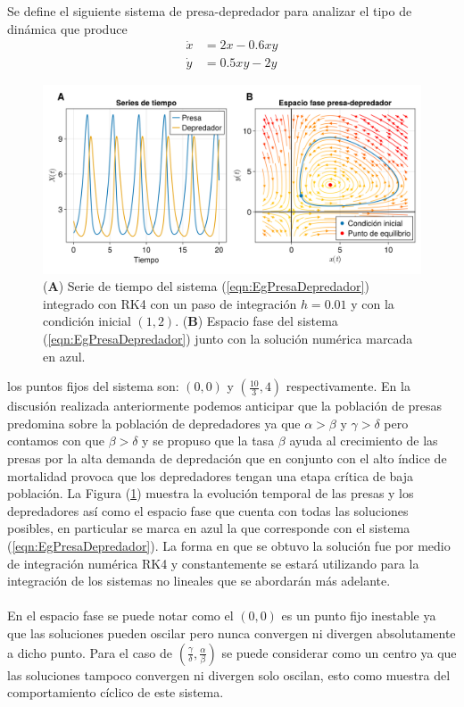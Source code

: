 \begin{ejemplo}\label{eg:PresaDepredador}
	Se define el siguiente sistema de presa-depredador para analizar el tipo de dinámica que produce
	\begin{equation}\label{eqn:EgPresaDepredador}
		\begin{split}
			\dot{x} &= 2x-0.6xy \\
			\dot{y} &= 0.5xy-2y
		\end{split}
	\end{equation}
	\begin{figure}[h!]
		\centering
		\includegraphics[scale=0.215]{../../Imagenes/Espacio fase PD}
		\caption{(\textbf{A}) Serie de tiempo del sistema (\ref{eqn:EgPresaDepredador}) integrado con RK4 con un paso de integración $h=0.01$ y con la condición inicial $(1,2)$. (\textbf{B}) Espacio fase del sistema (\ref{eqn:EgPresaDepredador}) junto con la solución numérica marcada en azul.}
		\label{fig:EspacioFasePD}
	\end{figure}
	los puntos fijos del sistema son: $(0,0)$ y $(\frac{10}{3},4)$ respectivamente. En la discusión realizada anteriormente podemos anticipar que la población de presas predomina sobre la población de depredadores ya que $\alpha>\beta$ y $\gamma>\delta$ pero contamos con que $\beta>\delta$ y se propuso que la tasa $\beta$ ayuda al crecimiento de las presas por la alta demanda de depredación que en conjunto con el alto índice de mortalidad provoca que los depredadores tengan una etapa crítica de baja población. La Figura (\ref{fig:EspacioFasePD}) muestra la evolución temporal de las presas y los depredadores así como el espacio fase que cuenta con todas las soluciones posibles, en particular se marca en azul la que corresponde con el sistema (\ref{eqn:EgPresaDepredador}). La forma en que se obtuvo la solución fue por medio de integración numérica RK4 y constantemente se estará utilizando para la integración de los sistemas no lineales que se abordarán más adelante.\\
	\\
	En el espacio fase se puede notar como el $(0,0)$ es un punto fijo inestable ya que las soluciones pueden oscilar pero nunca convergen ni divergen absolutamente a dicho punto. Para el caso de $(\frac{\gamma}{\delta},\frac{\alpha}{\beta})$ se puede considerar como un centro ya que las soluciones tampoco convergen ni divergen solo oscilan, esto como muestra del comportamiento cíclico de este sistema.
	
\end{ejemplo}
